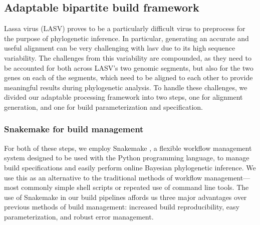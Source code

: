 \subsection{Adaptable bipartite build framework}

Lassa virus (LASV) proves to be a particularly difficult virus to preprocess for the purpose of phylogenetic inference.
In particular, generating an accurate and useful alignment can be very challenging with \gls{lasv} due to its high sequence variability.
The challenges from this variability are compounded, as they need to be accounted for both across LASV's two genomic segments, but also for the two genes on each of the segments, which need to be aligned to each other to provide meaningful results during phylogenetic analysis.
To handle these challenges, we divided our adaptable processing framework into two steps, one for alignment generation, and one for build parameterization and specification.

\subsubsection{Snakemake for build management}

For both of these steps, we employ Snakemake \cite{koster2012snakemake}, a flexible workflow management system designed to be used with the Python programming language, to manage build specifications and easily perform online Bayesian phylogenetic inference.
We use this as an alternative to the traditional methods of workflow management---most commonly simple shell scripts or repeated use of command line tools.
The use of Snakemake in our build pipelines affords us three major advantages over previous methods of build management: increased build reproducibility, easy parameterization, and robust error management.

